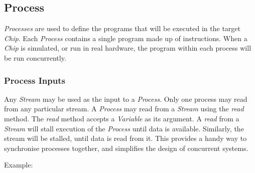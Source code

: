 \documentclass[letterpaper,10pt,english]{sphinxmanual}
\begin{document}
\subsection{Process}
\label{language_reference/index:process}\label{language_reference/index:module-chips.process}
\emph{Processes} are used to define the programs that will be executed in the target
\emph{Chip}.  Each \emph{Process} contains a single program made up of instructions. When
a \emph{Chip} is simulated, or run in real hardware, the program within each process
will be run concurrently.


\subsubsection{Process Inputs}
\label{language_reference/index:process-inputs}
Any \emph{Stream} may be used as the input to a \emph{Process}. Only one process may read
from any particular stream.  A \emph{Process} may read from a \emph{Stream} using the
\emph{read} method. The \emph{read} method accepts a \emph{Variable} as its argument. A \emph{read}
from a \emph{Stream} will stall execution of the \emph{Process} until data is available.
Similarly, the stream will be stalled, until data is read from it. This
provides a handy way to synchronise processes together, and simplifies the
design of concurrent systems.

Example:
\end{document}
